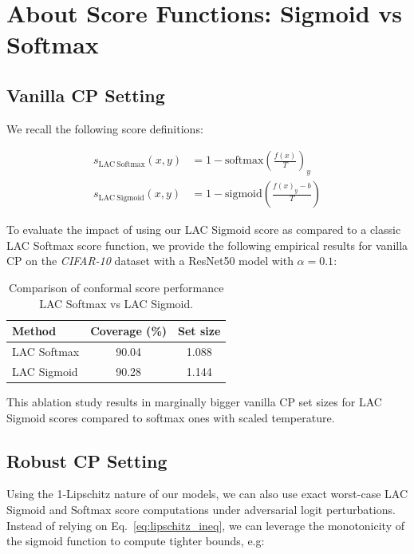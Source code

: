 \section{About Score Functions: Sigmoid vs Softmax}
\label{app:scores}

\subsection{Vanilla CP Setting}

We recall the following score definitions: 

\begin{equation}
\begin{aligned}
    s_\mathrm{LAC \ Softmax} (x, y) &= 1 - \text{softmax} \left( \frac{f(x)}{T} \right)_y \\
    s_\mathrm{LAC \ Sigmoid} (x, y) &= 1 - \text{sigmoid} \left( \frac{f(x)_y - b}{T} \right)
\end{aligned}
\end{equation}

To evaluate the impact of using our LAC Sigmoid score as compared to a classic LAC Softmax score function, we provide the following empirical results for vanilla CP on the \textsl{CIFAR-10} dataset with a ResNet50 model with $\alpha = 0.1$:

\begin{table}[h]
  \centering
  \begin{tabular}{l S S}
    \toprule
    Method       & {Coverage (\%)} & {Set size} \\
    \midrule
    LAC Softmax  & 90.04           & 1.088      \\
    LAC Sigmoid  & 90.28           & 1.144      \\
    \bottomrule
  \end{tabular}
  \caption{Comparison of conformal score performance LAC Softmax vs LAC Sigmoid.}
  \label{tab:scores}
\end{table}

This ablation study results in marginally bigger vanilla CP set sizes for LAC Sigmoid scores compared to softmax ones with scaled temperature.


\subsection{Robust CP Setting}

Using the 1-Lipschitz nature of our models, we can also use exact worst-case LAC Sigmoid and Softmax score computations under adversarial logit perturbations. Instead of relying on Eq.~\ref{eq:lipschitz_ineq}, we can leverage the monotonicity of the sigmoid function to compute tighter bounds, e.g:

